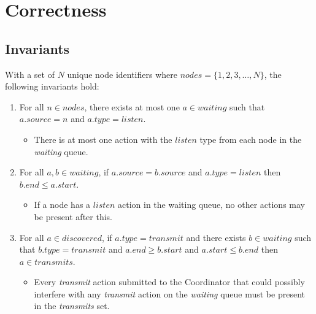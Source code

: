 \section{Correctness}

\subsection{Invariants}\label{sec:coordinator-invariants}

With a set of $N$ unique node identifiers where $\mathit{nodes} = \{ 1, 2, 3, \ldots, N \}$, the following
invariants hold:

\begin{enumerate}
    \item For all $n \in \mathit{nodes}$, there exists at most one $a \in \mathit{waiting}$ such that
          $a.\mathit{source} = n$ and $a.\mathit{type} = \mathit{listen}$.
          \begin{itemize}
              \item There is at most one action with the $\mathit{listen}$ type from each node in the
                    \textit{waiting} queue.
          \end{itemize}
    \item For all $a, b \in \mathit{waiting}$, if $a.\mathit{source} = b.\mathit{source}$ and $a.\mathit{type}
              = \mathit{listen}$ then $b.\mathit{end} \leq a.\mathit{start}$.
          \begin{itemize}
              \item If a node has a $\mathit{listen}$ action in the waiting queue, no other actions may be
                    present after this.
          \end{itemize}
    \item For all $a \in \mathit{discovered}$, if $a.\mathit{type} = \mathit{transmit}$ and there exists $b
              \in \mathit{waiting}$ such that $b.\mathit{type} = \mathit{transmit}$ and $a.\mathit{end} \geq
              b.\mathit{start}$ and $a.\mathit{start} \leq b.\mathit{end}$ then $a \in \mathit{transmits}$.
          \begin{itemize}
              \item Every \textit{transmit} action submitted to the Coordinator that could possibly interfere
                    with any \textit{transmit} action on the \textit{waiting} queue must be present in the
                    \textit{transmits} set.
          \end{itemize}
\end{enumerate}

